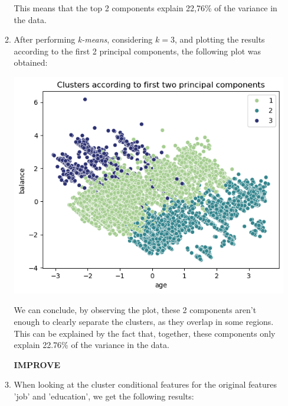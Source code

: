 \documentclass[12pt]{article}
\begin{document}
\begin{enumerate}[leftmargin=0pt, label=\textbf{\arabic*.)},start=1]
\begin{enumerate}[leftmargin=0pt, label=\textbf{\alph*.)}]
                    This means that the top 2 components explain 22,76\% of the variance in the data.

              \item After performing \textit{k-means}, considering $k=3$, and plotting the results according to the first 2 principal components, the following plot was obtained:

                    \begin{center}
                        \includegraphics{clusters_first_two_components.png}
                    \end{center}

                    We can conclude, by observing the plot, these 2 components aren't enough to clearly separate the clusters, as they overlap in some regions. This can be explained by the fact that, together, these components only explain 22.76\% of the variance in the data.

                    \textbf{IMPROVE}
              \item When looking at the cluster conditional features for the original features 'job' and 'education', we get the following results:


\end{enumerate}
\end{enumerate}
\end{document}
